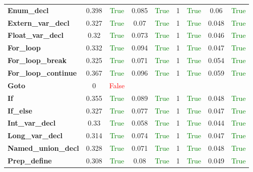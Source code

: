 \documentclass{article}
\begin{document}
\begin{xltabular}{\textwidth}{lcccccccc}
\textbf{{\fontsize{10}{12}\selectfont Enum\_decl}}& 0.398&\textcolor{green}{True}& 0.085&\textcolor{green}{True}& 1&\textcolor{green}{True}& 0.06&\textcolor{green}{True} \\[0.5ex]
\textbf{{\fontsize{10}{12}\selectfont Extern\_var\_decl}}& 0.327&\textcolor{green}{True}& 0.07&\textcolor{green}{True}& 1&\textcolor{green}{True}& 0.048&\textcolor{green}{True} \\[0.5ex]
\textbf{{\fontsize{10}{12}\selectfont Float\_var\_decl}}& 0.32&\textcolor{green}{True}& 0.073&\textcolor{green}{True}& 1&\textcolor{green}{True}& 0.046&\textcolor{green}{True} \\[0.5ex]
\textbf{{\fontsize{10}{12}\selectfont For\_loop}}& 0.332&\textcolor{green}{True}& 0.094&\textcolor{green}{True}& 1&\textcolor{green}{True}& 0.047&\textcolor{green}{True} \\[0.5ex]
\textbf{{\fontsize{10}{12}\selectfont For\_loop\_break}}& 0.325&\textcolor{green}{True}& 0.071&\textcolor{green}{True}& 1&\textcolor{green}{True}& 0.054&\textcolor{green}{True} \\[0.5ex]
\textbf{{\fontsize{10}{12}\selectfont For\_loop\_continue}}& 0.367&\textcolor{green}{True}& 0.096&\textcolor{green}{True}& 1&\textcolor{green}{True}& 0.059&\textcolor{green}{True} \\[0.5ex]
\textbf{{\fontsize{10}{12}\selectfont Goto}}& 0&\textcolor{red}{False} \\[0.5ex]
\textbf{{\fontsize{10}{12}\selectfont If}}& 0.355&\textcolor{green}{True}& 0.089&\textcolor{green}{True}& 1&\textcolor{green}{True}& 0.048&\textcolor{green}{True} \\[0.5ex]
\textbf{{\fontsize{10}{12}\selectfont If\_else}}& 0.327&\textcolor{green}{True}& 0.077&\textcolor{green}{True}& 1&\textcolor{green}{True}& 0.047&\textcolor{green}{True} \\[0.5ex]
\textbf{{\fontsize{10}{12}\selectfont Int\_var\_decl}}& 0.33&\textcolor{green}{True}& 0.058&\textcolor{green}{True}& 1&\textcolor{green}{True}& 0.044&\textcolor{green}{True} \\[0.5ex]
\textbf{{\fontsize{10}{12}\selectfont Long\_var\_decl}}& 0.314&\textcolor{green}{True}& 0.074&\textcolor{green}{True}& 1&\textcolor{green}{True}& 0.047&\textcolor{green}{True} \\[0.5ex]
\textbf{{\fontsize{10}{12}\selectfont Named\_union\_decl}}& 0.328&\textcolor{green}{True}& 0.071&\textcolor{green}{True}& 1&\textcolor{green}{True}& 0.048&\textcolor{green}{True} \\[0.5ex]
\textbf{{\fontsize{10}{12}\selectfont Prep\_define}}& 0.308&\textcolor{green}{True}& 0.08&\textcolor{green}{True}& 1&\textcolor{green}{True}& 0.049&\textcolor{green}{True} \\[0.5ex]

\end{xltabular}
\end{document}
